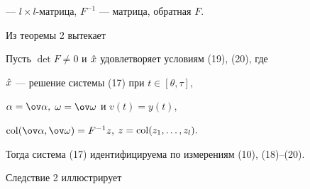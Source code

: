 --- $l\times l$-матрица, $F^{-1}$ --- матрица, обратная $F.$





Из теоремы 2 вытекает





\begin{cor}


Пусть $\det F\ne 0$ и $\Hat{x}$ удовлетворяет условиям (19), (20), где


$\Hat{x}$ --- решение системы (17) при $t\in[\theta,\tau],$


$\alpha=\ov\alpha,$ $\omega=\ov\omega$ и $v(t)=y(t),$


$\col(\ov\alpha,\ov\omega) = F^{-1} z,$ $z=\operatorname{col}(z_1,\dotsc,z_l).$


Тогда система (17) идентифицируема по измерениям (10), (18)--(20).


\end{cor}





Следствие 2 иллюстрирует





